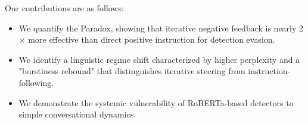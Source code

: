 Our contributions are as follows:
\begin{itemize}[leftmargin=*,itemsep=0pt,topsep=0pt]
    \item We quantify the \bullying Paradox, showing that iterative negative feedback is nearly 2$\times$ more effective than direct positive instruction for detection evasion.
    \item We identify a linguistic regime shift characterized by higher perplexity and a "burstiness rebound" that distinguishes iterative steering from instruction-following.
    \item We demonstrate the systemic vulnerability of RoBERTa-based detectors to simple conversational dynamics.
\end{itemize}
